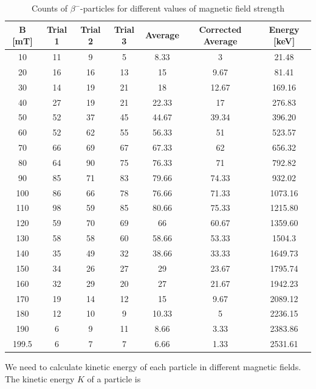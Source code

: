 \documentclass[a4paper,12pt]{article}
\begin{document}
\begin{table}[h!]
	\begin{center}
\begin{tabular}{|c|c|c|c|c|c||c|}
	\hline \textbf{B [mT]} & \textbf{Trial 1} & \textbf{Trial 2}  & \textbf{Trial 3} & \textbf{Average} & \textbf{Corrected Average} & \textbf{Energy [keV]   } \\ 
	\hline 10 & 11 & 9 & 5 & 8.33 & 3 & 21.48 \\ 
	\hline 20 & 16 & 16 & 13 & 15 & 9.67 & 81.41 \\ 
	\hline 30 & 14 & 19 & 21 & 18 & 12.67 & 169.16 \\ 
	\hline 40 & 27 & 19 & 21 & 22.33 & 17 & 276.83 \\ 
	\hline 50 & 52 & 37 & 45 & 44.67 & 39.34 & 396.20 \\ 
	\hline 60 & 52 & 62 & 55 & 56.33 & 51 & 523.57 \\ 
	\hline 70 & 66 & 69 & 67 & 67.33 & 62 & 656.32 \\ 
	\hline 80 & 64 & 90 & 75 & 76.33 & 71 & 792.82 \\ 
	\hline 90 & 85 & 71 & 83 & 79.66 & 74.33 & 932.02 \\ 
	\hline 100 & 86 & 66 & 78 & 76.66 & 71.33 & 1073.16 \\ 
	\hline 110 & 98 & 59 & 85 & 80.66 & 75.33 & 1215.80 \\ 
	\hline 120 & 59 & 70 & 69 & 66 & 60.67 & 1359.60 \\ 
	\hline 130 & 58 & 58 & 60 & 58.66 & 53.33 & 1504.3 \\ 
	\hline 140 & 35 & 49 & 32 & 38.66 & 33.33 & 1649.73 \\ 
	\hline 150 & 34 & 26 & 27 & 29 & 23.67 & 1795.74 \\ 
	\hline 160 & 32 & 29 & 20 & 27 & 21.67 & 1942.23 \\ 
	\hline 170 & 19 & 14 & 12 & 15 & 9.67 & 2089.12 \\ 
	\hline 180 & 12 & 10 & 9 & 10.33 & 5 & 2236.15 \\ 
	\hline 190 & 6 & 9 & 11 & 8.66 & 3.33 & 2383.86 \\ 
	\hline 199.5 & 6 & 7 & 7 & 6.66 & 1.33 & 2531.61 \\ 
	\hline 
\end{tabular} 
\caption{Counts of $\beta^{-}$-particles for different values of magnetic field strength}
\end{center} 
\end{table}
We need to calculate kinetic energy of each particle in different magnetic fields. The kinetic energy $K$ of a particle is
\end{document}
